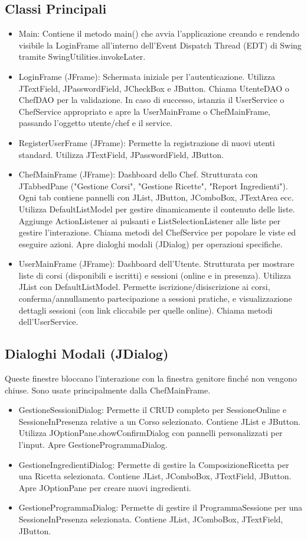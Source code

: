 \documentclass[a4paper, 12pt]{article}
\begin{document}
\subsection{Classi Principali}
\begin{itemize}
    \item Main: Contiene il metodo main() che avvia l'applicazione creando e rendendo visibile la LoginFrame all'interno dell'Event Dispatch Thread (EDT) di Swing tramite SwingUtilities.invokeLater.
    \item LoginFrame (JFrame): Schermata iniziale per l'autenticazione. Utilizza JTextField, JPasswordField, JCheckBox e JButton. Chiama UtenteDAO o ChefDAO per la validazione. In caso di successo, istanzia il UserService o ChefService appropriato e apre la UserMainFrame o ChefMainFrame, passando l'oggetto utente/chef e il service.
    \item RegisterUserFrame (JFrame): Permette la registrazione di nuovi utenti standard. Utilizza JTextField, JPasswordField, JButton.
    \item ChefMainFrame (JFrame): Dashboard dello Chef. Strutturata con JTabbedPane ("Gestione Corsi", "Gestione Ricette", "Report Ingredienti"). Ogni tab contiene pannelli con JList, JButton, JComboBox, JTextArea ecc. Utilizza DefaultListModel per gestire dinamicamente il contenuto delle liste. Aggiunge ActionListener ai pulsanti e ListSelectionListener alle liste per gestire l'interazione. Chiama metodi del ChefService per popolare le viste ed eseguire azioni. Apre dialoghi modali (JDialog) per operazioni specifiche.
    \item UserMainFrame (JFrame): Dashboard dell'Utente. Strutturata per mostrare liste di corsi (disponibili e iscritti) e sessioni (online e in presenza). Utilizza JList con DefaultListModel. Permette iscrizione/disiscrizione ai corsi, conferma/annullamento partecipazione a sessioni pratiche, e visualizzazione dettagli sessioni (con link cliccabile per quelle online). Chiama metodi dell'UserService.
\end{itemize}

\subsection{Dialoghi Modali (JDialog)}
Queste finestre bloccano l'interazione con la finestra genitore finché non vengono chiuse. Sono usate principalmente dalla ChefMainFrame.
\begin{itemize}
    \item GestioneSessioniDialog: Permette il CRUD completo per SessioneOnline e SessioneInPresenza relative a un Corso selezionato. Contiene JList e JButton. Utilizza JOptionPane.showConfirmDialog con pannelli personalizzati per l'input. Apre GestioneProgrammaDialog.
    \item GestioneIngredientiDialog: Permette di gestire la ComposizioneRicetta per una Ricetta selezionata. Contiene JList, JComboBox, JTextField, JButton. Apre JOptionPane per creare nuovi ingredienti.
    \item GestioneProgrammaDialog: Permette di gestire il ProgrammaSessione per una SessioneInPresenza selezionata. Contiene JList, JComboBox, JTextField, JButton.
\end{itemize}
\end{document}
